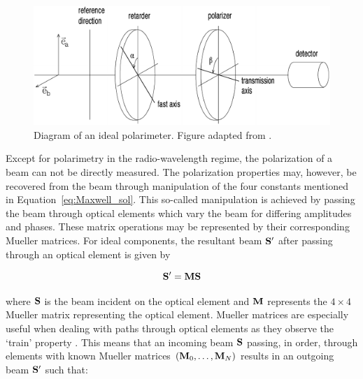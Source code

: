 

\begin{figure}[t]
    \centering
    \includegraphics[width=1\textwidth]{figures/2_polarimeter.pdf}
    \caption{Diagram of an ideal polarimeter. Figure adapted from \cite{pol_in_spectra}.}
    \label{fig:polarimeter}
\end{figure}

Except for polarimetry in the radio-wavelength regime, the polarization of a beam can not be directly measured. The polarization properties may, however, be recovered from the beam through manipulation of the four constants mentioned in Equation~\ref{eq:Maxwell_sol}. This so-called manipulation is achieved by passing the beam through optical elements which vary the beam for differing amplitudes and phases. These matrix operations may be represented by their corresponding Mueller matrices. For ideal components, the resultant beam $\mathbf{S}^{\prime}$ after passing through an optical element is given by

\begin{equation}
    \mathbf{S}^{\prime} = \mathbf{M} \mathbf{S}
\end{equation}

\noindent where $\mathbf{S}$ is the beam incident on the optical element and $\mathbf{M}$ represents the $4 \times 4$ Mueller matrix representing the optical element. Mueller matrices are especially useful when dealing with paths through optical elements as they observe the `train' property \citep{Mueller_train}. This means that an incoming beam $\mathbf{S}$ passing, in order, through elements with known Mueller matrices $(\mathbf{M}_{0}, \dots, \mathbf{M}_{N})$ results in an outgoing beam $\mathbf{S}^{\prime}$ such that:

